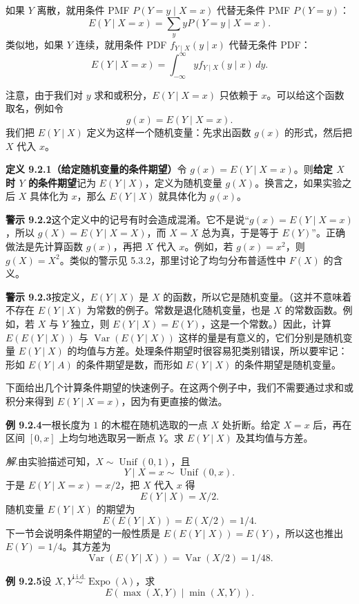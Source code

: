 \documentclass[UTF8, 12pt, fontset=fandol, oneside]{ctexart}
\begin{document}
如果 $Y$ 离散，就用条件 PMF $P(Y=y\mid X=x)$ 代替无条件 PMF $P(Y=y)$：
\[
  E(Y\mid X=x)=\sum_y yP(Y=y\mid X=x).
\]
类似地，如果 $Y$ 连续，就用条件 PDF $f_{Y\mid X}(y\mid x)$ 代替无条件 PDF：
\[
  E(Y\mid X=x)=\int_{-\infty}^{\infty} y f_{Y\mid X}(y\mid x)\,dy.
\]

注意，由于我们对 $y$ 求和或积分，$E(Y\mid X=x)$ 只依赖于 $x$。可以给这个函数取名，例如令
\[
  g(x)=E(Y\mid X=x).
\]
我们把 $E(Y\mid X)$ 定义为这样一个随机变量：先求出函数 $g(x)$ 的形式，然后把 $X$ 代入 $x$。

\noindent\textbf{定义 9.2.1（给定随机变量的条件期望）}\quad 令 $g(x)=E(Y\mid X=x)$。则\textbf{给定 $X$ 时 $Y$ 的条件期望}记为 $E(Y\mid X)$，定义为随机变量 $g(X)$。换言之，如果实验之后 $X$ 具体化为 $x$，那么 $E(Y\mid X)$ 就具体化为 $g(x)$。

\noindent\textbf{警示 9.2.2}\quad 这个定义中的记号有时会造成混淆。它不是说“$g(x)=E(Y\mid X=x)$，所以 $g(X)=E(Y\mid X=X)$，而 $X=X$ 总为真，于是等于 $E(Y)$”。正确做法是先计算函数 $g(x)$，再把 $X$ 代入 $x$。例如，若 $g(x)=x^2$，则 $g(X)=X^2$。类似的警示见 5.3.2，那里讨论了均匀分布普适性中 $F(X)$ 的含义。

\noindent\textbf{警示 9.2.3}\quad 按定义，$E(Y\mid X)$ 是 $X$ 的函数，所以它是随机变量。（这并不意味着不存在 $E(Y\mid X)$ 为常数的例子。常数是退化随机变量，也是 $X$ 的常数函数。例如，若 $X$ 与 $Y$ 独立，则 $E(Y\mid X)=E(Y)$，这是一个常数。）因此，计算 $E(E(Y\mid X))$ 与 $\operatorname{Var}(E(Y\mid X))$ 这样的量是有意义的，它们分别是随机变量 $E(Y\mid X)$ 的均值与方差。处理条件期望时很容易犯类别错误，所以要牢记：形如 $E(Y\mid A)$ 的条件期望是数，而形如 $E(Y\mid X)$ 的条件期望是随机变量。

下面给出几个计算条件期望的快速例子。在这两个例子中，我们不需要通过求和或积分来得到 $E(Y\mid X=x)$，因为有更直接的做法。

\noindent\textbf{例 9.2.4}\quad 一根长度为 $1$ 的木棍在随机选取的一点 $X$ 处折断。给定 $X=x$ 后，再在区间 $[0,x]$ 上均匀地选取另一断点 $Y$。求 $E(Y\mid X)$ 及其均值与方差。

\noindent\textit{解.}\quad 由实验描述可知，$X\sim\operatorname{Unif}(0,1)$，且
\[
  Y\mid X=x\sim\operatorname{Unif}(0,x).
\]
于是 $E(Y\mid X=x)=x/2$，把 $X$ 代入 $x$ 得
\[
  E(Y\mid X)=X/2.
\]
随机变量 $E(Y\mid X)$ 的期望为
\[
  E(E(Y\mid X))=E(X/2)=1/4.
\]
下一节会说明条件期望的一般性质是 $E(E(Y\mid X))=E(Y)$，所以这也推出 $E(Y)=1/4$。其方差为
\[
  \operatorname{Var}(E(Y\mid X))=\operatorname{Var}(X/2)=1/48.
\]

\noindent\textbf{例 9.2.5}\quad 设 $X,Y\stackrel{\text{i.i.d.}}{\sim}\operatorname{Expo}(\lambda)$，求
\[
  E(\max(X,Y)\mid \min(X,Y)).
\]
\end{document}
